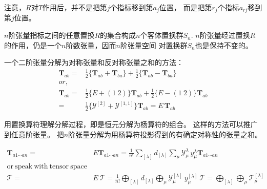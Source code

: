 \begin{note}
注意，$R$对$T$作用后，并不是把第$j$个指标移到第$a_j$位置，
而是把第$r_j$个指标$a_{rj}$移到第$j$位置。


$n$阶张量指标之间的任意置换$R$的集合构成$n$个客体置换群$S_n$.
$n$阶张量经过置换$R$的作用，仍是一个$n$阶数张量，因而$n$阶张量空间
对置换群$S_n$也是保持不变的。
\end{note}

\begin{example}[二阶张量分解]
一个二阶张量分解为对称张量和反对称张量之和的方法：
\begin{equation}\begin{aligned}
\label{eq.8.1.6}
\mathbf{T}_{ab}={}&\frac{1}{2}\{\mathbf{T}_{ab}+\mathbf{T}_{ba}\}+
\frac{1}{2}\{\mathbf{T}_{ab}-\mathbf{T}_{ba}\}\\
or,\\
\mathbf{T}_{ab}={}&\frac{1}{2}\{E+(1~2)\}\mathbf{T}_{ab}+
\frac{1}{2}\{E-(1~2)\}\mathbf{T}_{ab}\\
{}={}&\frac{1}{2}\{\mathcal{Y}^{[2]}+\mathcal{Y}^{[1,1]}\}\mathbf{T}_{ab}
=E\,\mathbf{T}_{ab}
\end{aligned}\end{equation}
\end{example}

用置换算符理解分解过程，即是恒元分解为杨算符的组合。
这样的方法可以推广到任意阶张量。
把$n$阶张量分解为用杨算符投影得到的有确定对称性的张量之和。

\begin{newprop}[张量分解]
\begin{equation}\begin{aligned}
\label{eq.8.1.7}
\mathbf{T}_{a1\cdots an}={}&
E \mathbf{T}_{a1\cdots an}=
\frac{1}{n!}\sum\limits_{[\lambda]} d_{[\lambda]}
\sum\limits_{\mu} 
\mathcal{Y}_\mu^{\lambda}\,
y_\mu^{\lambda}
\mathbf{T}_{a1\cdots an}\\
\mathrm{or~speak~with~tensor~space} \\
\mathcal{T}={}&
E~\mathcal{T}=
\frac{1}{n!}
\bigoplus\limits_{[\lambda]} d_{[\lambda]}
\bigoplus\limits_{\mu} 
\mathcal{Y}_\mu^{[\lambda]}~
y_\mu^{[\lambda]}~\mathcal{T}=
\bigoplus\limits_{[\lambda]}
\bigoplus\limits_{\mu}
\mathcal{T}_\mu^{[\lambda]}
\end{aligned}\end{equation}
\end{newprop}

